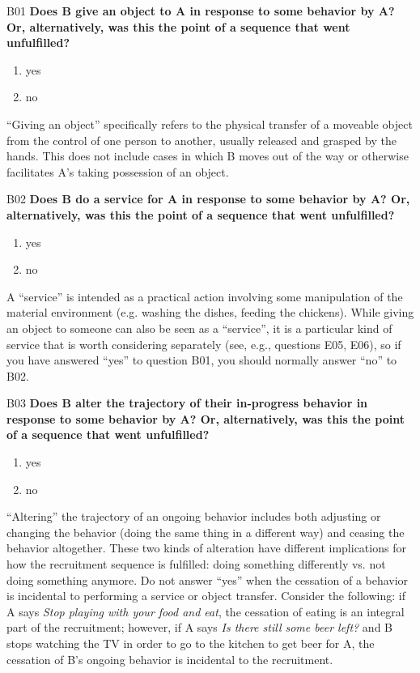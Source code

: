 \documentclass[output=paper]{langsci/langscibook}
\begin{document}
\begin{description}
\item
B01  \textbf{Does B give an object to A in response to some behavior by A? Or, alternatively, was this the point of a sequence that went unfulfilled?}

\begin{enumerate}
\item{yes}
\item {no}
\end{enumerate}

“Giving an object” specifically refers to the physical transfer of a moveable object from the control of one person to another, usually released and grasped by the hands. This does not include cases in which B moves out of the way or otherwise facilitates A’s taking possession of an object.

\item
B02  \textbf{Does B do a service for A in response to some behavior by A? Or, alternatively, was this the point of a sequence that went unfulfilled?}

\begin{enumerate}
\item{yes}
\item {no}
\end{enumerate}

A “service” is intended as a practical action involving some manipulation of the material environment (e.g. washing the dishes, feeding the chickens). While giving an object to someone can also be seen as a “service”, it is a particular kind of service that is worth considering separately (see, e.g., questions E05, E06), so if you have answered “yes” to question B01, you should normally answer “no” to B02.

\item
B03  \textbf{Does B alter the trajectory of their in-progress behavior in response to some behavior by A? Or, alternatively, was this the point of a sequence that went unfulfilled?}

\begin{enumerate}
\item{yes}
\item {no}
\end{enumerate}

“Altering” the trajectory of an ongoing behavior includes both adjusting or changing the behavior (doing the same thing in a different way) and ceasing the behavior altogether. These two kinds of alteration have different implications for how the recruitment sequence is fulfilled: doing something differently vs. not doing something anymore. Do not answer “yes” when the cessation of a behavior is incidental to performing a service or object transfer. Consider the following: if A says \textit{Stop playing with your food and eat}, the cessation of eating is an integral part of the recruitment; however, if A says \textit{Is there still some beer left?} and B stops watching the TV in order to go to the kitchen to get beer for A, the cessation of B’s ongoing behavior is incidental to the recruitment.


\end{description}
\end{document}
